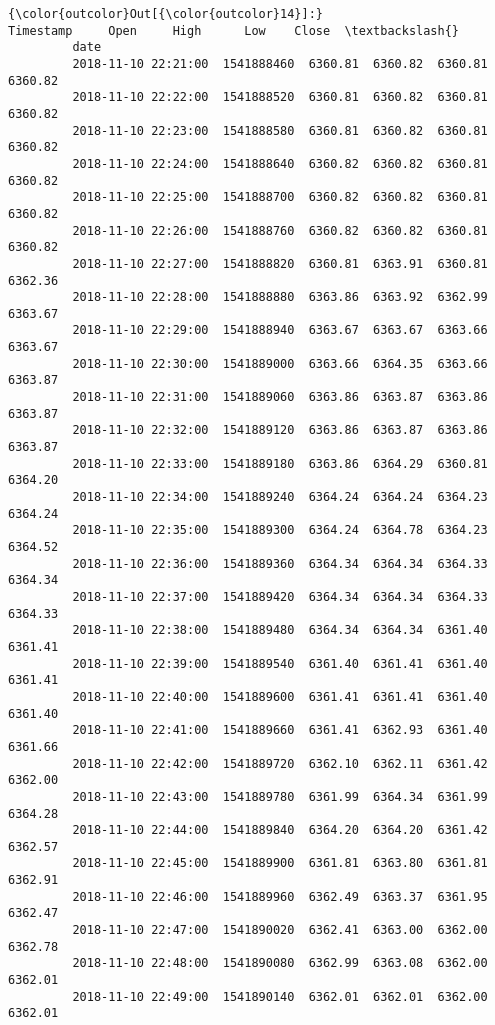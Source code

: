 \documentclass[11pt]{article}
\begin{document}
\begin{Verbatim}[commandchars=\\\{\}]
{\color{outcolor}Out[{\color{outcolor}14}]:}                       Timestamp     Open     High      Low    Close  \textbackslash{}
         date                                                                  
         2018-11-10 22:21:00  1541888460  6360.81  6360.82  6360.81  6360.82   
         2018-11-10 22:22:00  1541888520  6360.81  6360.82  6360.81  6360.82   
         2018-11-10 22:23:00  1541888580  6360.81  6360.82  6360.81  6360.82   
         2018-11-10 22:24:00  1541888640  6360.82  6360.82  6360.81  6360.82   
         2018-11-10 22:25:00  1541888700  6360.82  6360.82  6360.81  6360.82   
         2018-11-10 22:26:00  1541888760  6360.82  6360.82  6360.81  6360.82   
         2018-11-10 22:27:00  1541888820  6360.81  6363.91  6360.81  6362.36   
         2018-11-10 22:28:00  1541888880  6363.86  6363.92  6362.99  6363.67   
         2018-11-10 22:29:00  1541888940  6363.67  6363.67  6363.66  6363.67   
         2018-11-10 22:30:00  1541889000  6363.66  6364.35  6363.66  6363.87   
         2018-11-10 22:31:00  1541889060  6363.86  6363.87  6363.86  6363.87   
         2018-11-10 22:32:00  1541889120  6363.86  6363.87  6363.86  6363.87   
         2018-11-10 22:33:00  1541889180  6363.86  6364.29  6360.81  6364.20   
         2018-11-10 22:34:00  1541889240  6364.24  6364.24  6364.23  6364.24   
         2018-11-10 22:35:00  1541889300  6364.24  6364.78  6364.23  6364.52   
         2018-11-10 22:36:00  1541889360  6364.34  6364.34  6364.33  6364.34   
         2018-11-10 22:37:00  1541889420  6364.34  6364.34  6364.33  6364.33   
         2018-11-10 22:38:00  1541889480  6364.34  6364.34  6361.40  6361.41   
         2018-11-10 22:39:00  1541889540  6361.40  6361.41  6361.40  6361.41   
         2018-11-10 22:40:00  1541889600  6361.41  6361.41  6361.40  6361.40   
         2018-11-10 22:41:00  1541889660  6361.41  6362.93  6361.40  6361.66   
         2018-11-10 22:42:00  1541889720  6362.10  6362.11  6361.42  6362.00   
         2018-11-10 22:43:00  1541889780  6361.99  6364.34  6361.99  6364.28   
         2018-11-10 22:44:00  1541889840  6364.20  6364.20  6361.42  6362.57   
         2018-11-10 22:45:00  1541889900  6361.81  6363.80  6361.81  6362.91   
         2018-11-10 22:46:00  1541889960  6362.49  6363.37  6361.95  6362.47   
         2018-11-10 22:47:00  1541890020  6362.41  6363.00  6362.00  6362.78   
         2018-11-10 22:48:00  1541890080  6362.99  6363.08  6362.00  6362.01   
         2018-11-10 22:49:00  1541890140  6362.01  6362.01  6362.00  6362.01   

\end{Verbatim}
\end{document}
